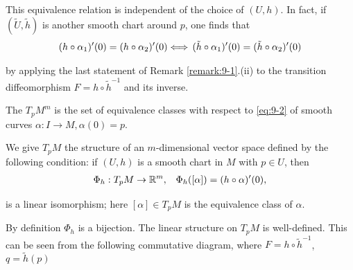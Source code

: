This equivalence relation is independent of the choice of $(U, h)$. In fact, 
if $(\tilde U, \tilde h)$ is another smooth chart around $p$, one finds that
\begin{align*}
  (h\circ\alpha_1)'(0) = (h\circ\alpha_2)'(0)
  \Longleftrightarrow\, 
  (\tilde h\circ\alpha_1)'(0) = (\tilde h\circ\alpha_2)'(0)
\end{align*}

by applying the last statement of Remark \ref{remark:9-1}.(ii) to the transition diffeomorphism
$F=h\circ \tilde{h}^{-1}$ and its inverse.

\begin{definition}\label{definition:9-2}
  The  $T_pM^m$ is the set of equivalence classes with
  respect to \eqref{eq:9-2} of smooth curves $\alpha:I\to M, \alpha(0)= p$.
\end{definition}

We give $T_pM$ the structure of an $m$-dimensional vector space defined by the
following condition: if $(U, h)$ is a smooth chart in $M$ with $p\in U$, then
\begin{align*}
  \Phi_h:T_pM\to{\ensuremath{\mathbb{R}}}^m, && \Phi_h([\alpha]) = (h\circ\alpha)'(0),
\end{align*}

is a linear isomorphism; here $[\alpha]\in T_pM$ is the equivalence class of $\alpha$.

By definition $\Phi_h$ is a bijection. The linear structure on $T_pM$ is well-defined.
This can be seen from the following commutative diagram, where $F=h\circ\tilde{h}^{-1}$,
$q=\tilde{h}(p)$

\begin{center}
\end{center}

